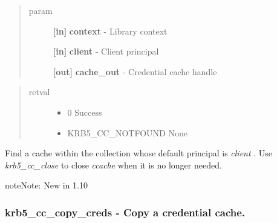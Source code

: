 \documentclass[letterpaper,10pt,english]{sphinxmanual}
\begin{document}
\begin{quote}\begin{description}
\item[{param}] \leavevmode
\textbf{{[}in{]}} \textbf{context} - Library context

\textbf{{[}in{]}} \textbf{client} - Client principal

\textbf{{[}out{]}} \textbf{cache\_out} - Credential cache handle

\end{description}\end{quote}
\begin{quote}\begin{description}
\item[{retval}] \leavevmode\begin{itemize}
\item {} 
0   Success

\item {} 
KRB5\_CC\_NOTFOUND   None

\end{itemize}

\end{description}\end{quote}

Find a cache within the collection whose default principal is \emph{client} . Use \emph{krb5\_cc\_close} to close \emph{ccache} when it is no longer needed.

\begin{notice}{note}{Note:}
New in 1.10
\end{notice}


\subsubsection{krb5\_cc\_copy\_creds -  Copy a credential cache.}
\label{appdev/refs/api/krb5_cc_copy_creds::doc}\label{appdev/refs/api/krb5_cc_copy_creds:krb5-cc-copy-creds-copy-a-credential-cache}

\begin{fulllineitems}
\label{appdev/refs/api/krb5_cc_copy_creds:krb5_cc_copy_creds}
\end{fulllineitems}
\end{document}
